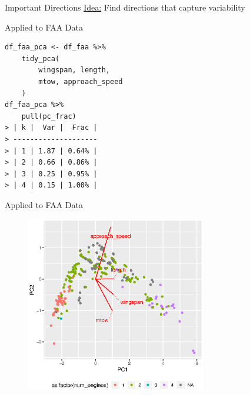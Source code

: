\documentclass[14pt]{beamer}
\begin{document}
\begin{frame}{Important Directions}
  \huge\underline{Idea:} Find directions that capture variability
\end{frame}


\begin{frame}[fragile]{Applied to FAA Data}
  \begin{lstlisting}
df_faa_pca <- df_faa %>%
    tidy_pca(
        wingspan, length,
        mtow, approach_speed
    )
df_faa_pca %>%
    pull(pc_frac)
> | k |  Var |  Frac |
> --------------------
> | 1 | 1.87 | 0.64% |
> | 2 | 0.66 | 0.86% |
> | 3 | 0.25 | 0.95% |
> | 4 | 0.15 | 1.00% |
  \end{lstlisting}
\end{frame}

\begin{frame}{Applied to FAA Data}
  \begin{figure}
    \centering\includegraphics[width=0.7\textwidth]{./images/faa_min_pca_plot}
  \end{figure}
\end{frame}

\end{document}
